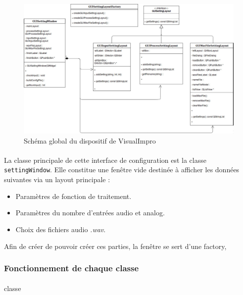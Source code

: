  \begin{figure}[h]
  \centering
  \includegraphics[scale=0.3]{umlSettingWindow.png}
  \caption{Schéma global du dispositif de VisualImpro}
  \label{schéma global}
 \end{figure}


 \paragraph{}
 La classe principale de cette interface de configuration est la
 classe \verb!settingWindow!. Elle constitue une fenêtre vide
 destinée à afficher les données suivantes via un layout principale :
 \begin{itemize}
  \item Paramètres de fonction de traitement.
  \item Paramètres du nombre d'entrées audio et analog.
  \item Choix des fichiers audio \textit{.wav}.
 \end{itemize}
 Afin de créer de pouvoir créer ces parties, la fenêtre se sert d'une factory,
  

 \subsubsection{Fonctionnement de chaque classe}
 \paragraph{}
 classe

